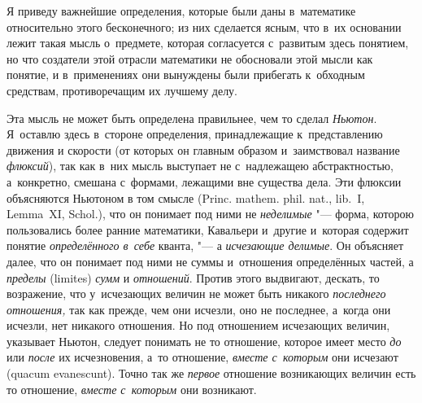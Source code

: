 Я приведу важнейшие определения, которые были даны в~математике относительно
этого бесконечного; из них сделается ясным, что в~их основании лежит такая
мысль о~предмете, которая согласуется с~развитым здесь понятием, но что
создатели этой отрасли математики не обосновали этой мысли как понятие, и
в~применениях они вынуждены были прибегать к~обходным средствам,
противоречащим их лучшему делу.

Эта мысль не может быть определена правильнее, чем то сделал {\em Ньютон}.
Я~оставлю здесь в~стороне определения, принадлежащие к~представлению движения и
скорости (от которых он главным образом и~заимствовал название {\em флюксий}),
так как в~них мысль выступает не с~надлежащею абстрактностью, а~конкретно,
смешана с~формами, лежащими вне существа дела. Эти флюксии объясняются Ньютоном
в том смысле (Princ. mathem. phil. nat., lib.~I, Lemma~XI, Schol.), что он
понимает под ними не {\em неделимые} "--- форма, которою пользовались более
ранние математики, Кавальери и~другие и~которая содержит понятие
{\em определённого в~себе} кванта, "--- а {\em исчезающие делимые}.
Он объясняет далее, что он понимает под ними не суммы и~отношения определённых
частей, а {\em пределы} (limites) {\em сумм} и {\em отношений}. Против этого
выдвигают, дескать, то возражение, что у~исчезающих величин не может быть
никакого {\em последнего отношения,} так как прежде, чем они исчезли, оно не
последнее, а~когда они исчезли, нет никакого отношения. Но под отношением
исчезающих величин, указывает Ньютон, следует понимать не то отношение, которое
имеет место {\em до} или {\em после} их исчезновения, а~то отношение,
{\em вместе с~которым} они исчезают (quacum evanescunt). Точно так же
{\em первое} отношение возникающих величин есть то отношение,
{\em вместе с~которым} они возникают.

